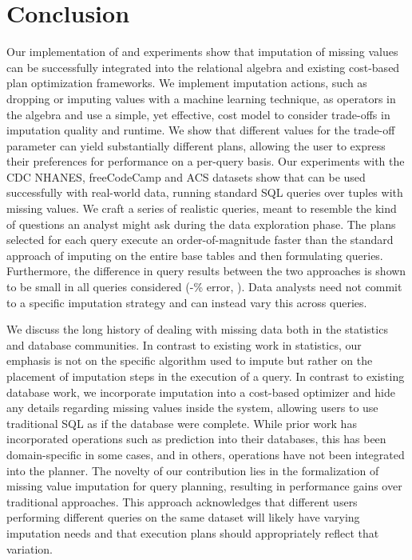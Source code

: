 \section{Conclusion}
Our implementation of \ProjectName{} and experiments show that imputation of missing values can be successfully integrated into the relational algebra and
existing cost-based plan optimization frameworks. We implement imputation actions, such as dropping or imputing values with a machine
learning technique, as operators in the algebra and use a simple, yet effective, cost model to consider trade-offs in 
imputation quality and runtime. We show that different values for the trade-off parameter can yield substantially
different plans, allowing the user to express their preferences for performance on a per-query basis.
Our experiments with the CDC NHANES, freeCodeCamp and ACS datasets
show that \ProjectName{} can be used successfully with real-world data, running standard SQL
queries over tuples with missing values. 
We craft a series of realistic queries, meant to resemble the kind of questions an analyst might ask during
the data exploration phase. The plans selected for each query execute an order-of-magnitude faster than
 the standard approach of imputing on the entire base tables and
then formulating queries. Furthermore, the difference in query results between the two approaches is
shown to be small in all queries considered (\lowsmapealphazero{}-\highsmapealphaone{}\% error, ). Data analysts need not commit to a specific imputation strategy and can instead
vary this across queries.

We discuss the long history of dealing with missing data both in the statistics and database communities.
In contrast to existing work in statistics, our emphasis is not on the specific algorithm
used to impute but rather on the placement of imputation steps in the execution of a query. In contrast to existing database work,
we incorporate imputation into a cost-based optimizer and hide any details
regarding missing values inside the system, allowing users to use traditional SQL as if the database were complete.
While prior work has incorporated operations such as prediction into their databases, this has been domain-specific
in some cases, and in others, operations have not been integrated into the planner. The novelty
of our contribution lies in the formalization of missing value imputation for query planning, resulting in performance
gains over traditional approaches. This approach acknowledges that different users performing different queries on the same
dataset will likely have varying imputation needs and that execution plans should appropriately reflect that variation.

